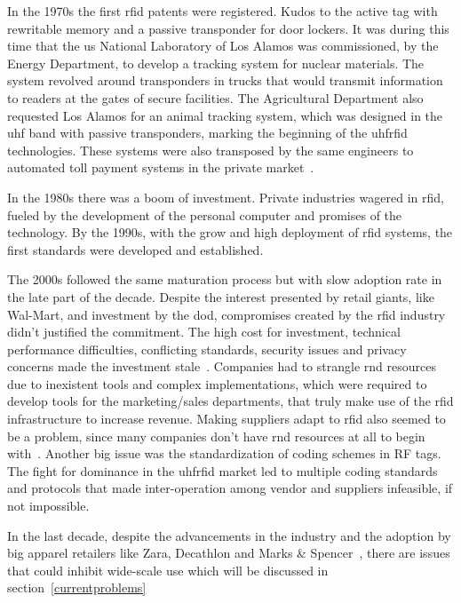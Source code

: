In the 1970s the first \ac{rfid} patents were registered. Kudos to the active tag with rewritable memory and a passive transponder for door lockers. It was during this time that the \ac{us} National Laboratory of Los Alamos was commissioned, by the Energy Department, to develop a tracking system for nuclear materials. The system revolved around transponders in trucks that would transmit information to readers at the gates of secure facilities. The Agricultural Department also requested Los Alamos for an animal tracking system, which was designed in the \ac{uhf} band with passive transponders, marking the beginning of the \ac{uhfrfid} technologies. These systems were also transposed by the same engineers to automated toll payment systems in the private market~\cite{landtHistoryRFID2005, HistoryRFIDTechnology,casierAnalogCircuitDesign2011}.

In the 1980s there was a boom of investment. Private industries wagered in \ac{rfid}, fueled by the development of the personal computer and promises of the technology.
By the 1990s, with the grow and high deployment of \ac{rfid} systems, the first standards were developed and established. 

The 2000s followed the same maturation process but with slow adoption rate in the late part of the decade. 
Despite the interest presented by retail giants, like Wal-Mart, and investment by the \ac{dod}, compromises created by the \ac{rfid} industry didn't justified the commitment. The high cost for investment, technical performance difficulties, conflicting standards, security issues and privacy concerns made the investment stale~\cite{RFIDAdoptionStalls}. 
Companies had to strangle \ac{rnd} resources due to inexistent tools and complex implementations, which were required to develop tools for the marketing/sales departments, that truly make use of the \ac{rfid} infrastructure to increase revenue.
Making suppliers adapt to \ac{rfid} also seemed to be a problem, since many companies don't have \ac{rnd} resources at all to begin with~\cite{gaudinSuppliersGainFailed2008}.
Another big issue was the standardization of coding schemes in RF tags. The fight for dominance in the \ac{uhfrfid} market led to multiple coding standards and protocols that made inter-operation among vendor and suppliers infeasible, if not impossible.

In the last decade, despite the advancements in the industry and the adoption by big apparel retailers like Zara, Decathlon and Marks \& Spencer~\cite{RFIDRetailApparel}, there are issues that could inhibit wide-scale use which will be discussed in section~\ref{currentproblems}


